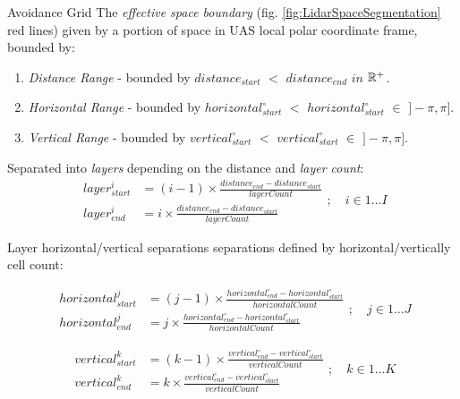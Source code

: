 \begin{definition}{Avoidance Grid}\label{def:AvoidanceGrid} The \emph{effective space boundary} (fig. \ref{fig:LidarSpaceSegmentation} red lines) given by a portion of space in UAS local polar coordinate frame, bounded by:
    \begin{enumerate}
        \item \emph{Distance Range} -  bounded by $distance_{start}$ $<$ $distance_{end}$ $in$ $\mathbb{R}^+$.
        \item \emph{Horizontal Range} - bounded by $horizontal^\circ_{start}$ $<$ $horizontal^\circ_{start}$ $\in$ $]-\pi,\pi]$.
        \item \emph{Vertical Range} - bounded by $vertical^\circ_{start}$ $<$ $vertical^\circ_{start}$ $\in$ $]-\pi,\pi]$.
    \end{enumerate}

\noindent Separated into \emph{layers} depending on the distance and \emph{layer count}:
\begin{equation}\label{eq:avoidanceGridCellDistanceRange}
    \begin{aligned}
        layer^i_{start} & = (i-1)\times\frac{distance_{end}-distance_{start}}{layer Count}\\
        layer^i_{end} & = i\times\frac{distance_{end}-distance_{start}}{layer Count}
    \end{aligned};\quad i\in 1\dots I
\end{equation}

\newpage\noindent Layer horizontal/vertical separations separations defined by horizontal/vertically cell count:

\begin{equation}\label{eq:avoidanceGridCellHorizontalRange}
    \begin{aligned}
        horizontal^j_{start} & = (j-1)\times\frac{horizontal^\circ_{end}-horizontal^\circ_{start}}{horizontal Count}\\
        horizontal^j_{end} & = j\times\frac{horizontal^\circ_{end}-horizontal^\circ_{start}}{horizontal Count}
    \end{aligned};\quad j\in 1\dots J
\end{equation}

\begin{equation}\label{eq:avoidanceGridCellVerticalRange}
    \begin{aligned}
        vertical^k_{start} & = (k-1)\times\frac{vertical^\circ_{end}-vertical^\circ_{start}}{vertical Count}\\
        vertical^k_{end} & = k\times\frac{vertical^\circ_{end}-vertical^\circ_{start}}{vertical Count}
    \end{aligned};\quad k\in 1\dots K
\end{equation}


\end{definition}
